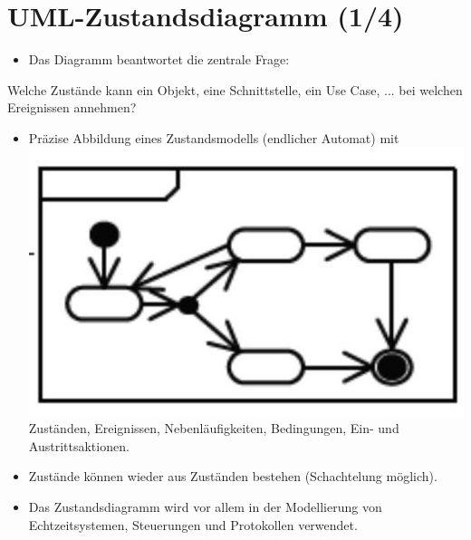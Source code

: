 \documentclass[10pt]{article}
\begin{document}
\section*{UML-Zustandsdiagramm (1/4)}
\begin{itemize}
  \item Das Diagramm beantwortet die zentrale Frage:
\end{itemize}

Welche Zustände kann ein Objekt, eine Schnittstelle, ein Use Case, ... bei welchen Ereignissen annehmen?

\begin{itemize}
  \item Präzise Abbildung eines Zustandsmodells (endlicher Automat) mit\\
\includegraphics[max width=\textwidth]{2025_01_02_787afb9584031d2940deg-17} Zuständen, Ereignissen, Nebenläufigkeiten, Bedingungen, Ein- und Austrittsaktionen.
  \item Zustände können wieder aus Zuständen bestehen (Schachtelung möglich).
  \item Das Zustandsdiagramm wird vor allem in der Modellierung von Echtzeitsystemen, Steuerungen und Protokollen verwendet.
\end{itemize}
\end{document}

